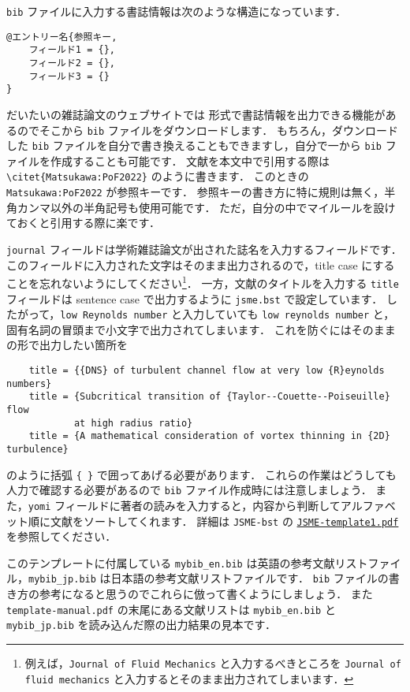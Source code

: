 \verb|bib| ファイルに入力する書誌情報は次のような構造になっています．
\begin{tcolorbox}[title={\texttt{bib} ファイル内の書誌情報の構造}]
\begin{verbatim}
@エントリー名{参照キー,
    フィールド1 = {},
    フィールド2 = {},
    フィールド3 = {}
}
\end{verbatim}
\end{tcolorbox}
\noindent
だいたいの雑誌論文のウェブサイトでは \BibTeX 形式で書誌情報を出力できる機能があるのでそこから \verb|bib| ファイルをダウンロードします．
もちろん，ダウンロードした \verb|bib| ファイルを自分で書き換えることもできますし，自分で一から \verb|bib| ファイルを作成することも可能です．
文献を本文中で引用する際は \verb|\citet{Matsukawa:PoF2022}| のように書きます．
このときの \verb|Matsukawa:PoF2022| が参照キーです．
参照キーの書き方に特に規則は無く，半角カンマ以外の半角記号も使用可能です．
ただ，自分の中でマイルールを設けておくと引用する際に楽です．

\verb|journal| フィールドは学術雑誌論文が出された誌名を入力するフィールドです．
このフィールドに入力された文字はそのまま出力されるので，title case にすることを忘れないようにしてください\footnote{例えば，\texttt{Journal of Fluid Mechanics} と入力するべきところを \texttt{Journal of fluid mechanics} と入力するとそのまま出力されてしまいます．}．
一方，文献のタイトルを入力する \verb|title| フィールドは sentence case で出力するように \verb|jsme.bst| で設定しています．
したがって，\verb|low Reynolds number| と入力していても \verb|low reynolds number| と，固有名詞の冒頭まで小文字で出力されてしまいます．
これを防ぐにはそのままの形で出力したい箇所を
\begin{verbatim}
    title = {{DNS} of turbulent channel flow at very low {R}eynolds numbers}
    title = {Subcritical transition of {Taylor--Couette--Poiseuille} flow 
            at high radius ratio}
    title = {A mathematical consideration of vortex thinning in {2D} turbulence}
\end{verbatim}
のように括弧 \verb|{ }| で囲ってあげる必要があります．
これらの作業はどうしても人力で確認する必要があるので \verb|bib| ファイル作成時には注意しましょう．
また，\verb|yomi| フィールドに著者の読みを入力すると，内容から判断してアルファベット順に文献をソートしてくれます．
詳細は \verb|JSME-bst| の \href{https://github.com/Yuki-MATSUKAWA/JSME-bst/blob/main/JSME-template1.pdf}{\texttt{JSME-template1.pdf}} を参照してください．

このテンプレートに付属している \verb|mybib_en.bib| は英語の参考文献リストファイル，\verb|mybib_jp.bib| は日本語の参考文献リストファイルです．
\verb|bib| ファイルの書き方の参考になると思うのでこれらに倣って書くようにしましょう．
また \verb|template-manual.pdf| の末尾にある文献リストは \verb|mybib_en.bib| と \verb|mybib_jp.bib| を読み込んだ際の出力結果の見本です．


